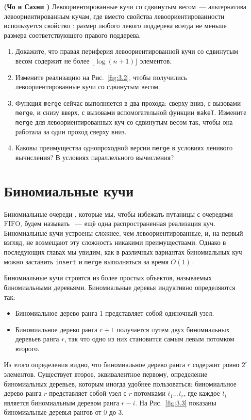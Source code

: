 \begin{exercise}\label{ex:3.4}
  \textbf{(Чо и Сахни \cite{ChoSahni1996})} Левоориентированные кучи
  со сдвинутым весом~--- альтернатива левоориентированным кучам, где
  вместо свойства левоориентированности используется свойство
  : размер любого левого поддерева всегда не меньше размера
  соответствующего правого поддерева.
  \begin{enumerate}
  \item Докажите, что правая периферия левоориентированной кучи со
    сдвинутым весом содержит не более $\lfloor \log(n+1) \rfloor$ элементов.
  \item Измените реализацию на Рис.~\ref{fig:3.2}, чтобы получились
    левоориентированные кучи со сдвинутым весом.
  \item Функция \lstinline!merge! сейчас выполняется в два прохода:
    сверху вниз, с вызовами \lstinline!merge!, и снизу вверх, с
    вызовами вспомогательной функции \lstinline!makeT!. Измените
    \lstinline!merge! для левоориентированных куч со сдвинутым весом
    так, чтобы она работала за один проход сверху вниз.
  \item Каковы преимущества однопроходной версии \lstinline!merge! в
    условиях ленивого вычисления? В условиях параллельного вычисления?
  \end{enumerate}
\end{exercise}

\section{Биномиальные кучи}
\label{sc:3.2}

Биномиальные очереди \cite{Vuillemin1978, Brown1978}, которые мы,
чтобы избежать путаницы с очередями FIFO, будем называть ~--- ещё одна распространенная реализация
куч. Биномиальные кучи устроены сложнее, чем левоориентированные, и, на
первый взгляд, не возмещают эту сложность никакими
преимуществами. Однако в последующих главах мы увидим, как в различных
вариантах биномиальных куч можно заставить \lstinline!insert! и
\lstinline!merge! выполняться за время $O(1)$.

Биномиальные кучи строятся из более простых объектов, называемых
биномиальными деревьями. Биномиальные деревья индуктивно определяются
так:
\begin{itemize}
\item Биномиальное дерево ранга 1 представляет собой одиночный узел.
\item Биномиальное дерево ранга $r+1$ получается путем
   двух биномиальных деревьев ранга $r$, так
  что одно из них становится самым левым потомком второго.
\end{itemize}
Из этого определения видно, что биномиальное дерево ранга $r$ содержит
ровно $2^r$ элементов.  Существует второе, эквивалентное первому,
определение биномиальных деревьев, которым иногда удобнее
пользоваться: биномиальное дерево ранга $r$ представляет собой узел
с $r$ потомками $t_1\ldots t_r$, где каждое $t_i$ является
биномиальным деревом ранга $r-i$.  На Рис.~\ref{fig:3.3} показаны
биномиальные деревья рангов от 0 до 3.

